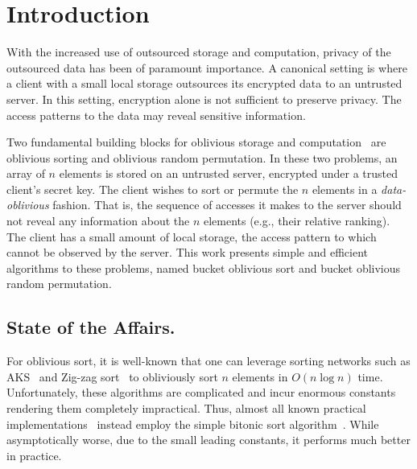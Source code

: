 


\section{Introduction}

With the increased use of outsourced storage and computation, privacy of the outsourced data has been of paramount importance. 
A canonical setting is where a client with a small local
storage outsources its encrypted data to an untrusted server. 
In this setting, encryption alone is not sufficient to preserve privacy.
The access patterns to the data may reveal sensitive information. 

Two fundamental building blocks for oblivious storage and computation~\cite{goldreich1996software,goodrich2011privacy,oblivistore} are oblivious sorting and oblivious random permutation.
In these two problems, an array of $n$ elements is stored on an untrusted server, encrypted under a trusted client's secret key.
The client wishes to sort or permute the $n$ elements in a \emph{data-oblivious} fashion.
That is, the sequence of accesses it makes to the server should not reveal any information about the $n$ elements (e.g., their relative ranking).
The client has a small amount of local storage, the access pattern to which cannot be observed by the server.
This work presents simple and efficient algorithms to these problems, named bucket oblivious sort and bucket oblivious random permutation.

\subsection{State of the Affairs.}
For oblivious sort, it is well-known that one can leverage 
sorting networks such as AKS~\cite{aks} and Zig-zag sort~\cite{zigzag}
to obliviously sort $n$ elements in $O(n\log n)$ time. 
Unfortunately, these algorithms are complicated and incur enormous constants rendering them completely impractical. 
Thus, almost all known practical implementations~\cite{oblivistore,oblivm,graphsc}
instead employ the simple bitonic sort algorithm~\cite{bitonic}. 
While asymptotically worse, due to the small leading constants, it performs much better in practice.

